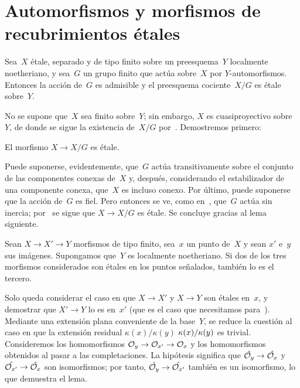 
\section{Automorfismos y morfismos de recubrimientos étales}
\label{V.3}

\begin{proposition}
\label{V.3.1}
Sea~$X$ étale, separado y de tipo finito sobre un preesquema~$Y$ localmente
noetheriano, y sea~$G$ un grupo finito que actúa sobre~$X$ por
$Y$-automorfismos. Entonces la acción de~$G$ es admisible y el preesquema
cociente~$X/G$ es étale sobre~$Y$.
\end{proposition}

No se supone que~$X$ sea finito sobre~$Y$; sin embargo, $X$ es
cuasiproyectivo sobre~$Y$, de donde se sigue la existencia de~$X/G$
por~. Demostremos primero:

\begin{corollaire}
\label{V.3.2}
El morfismo $X\to X/G$ es étale.
\end{corollaire}

Puede suponerse, evidentemente, que~$G$ actúa transitivamente sobre el
conjunto de las componentes conexas de~$X$ y, después, considerando el
estabilizador de una componente conexa, que~$X$ es incluso conexo. Por último,
puede suponerse que la acción de~$G$ es fiel. Pero entonces se ve, como
en~, que~$G$ actúa sin inercia; por~ se sigue que
$X\to X/G$ es étale. Se concluye gracias al lema siguiente.

\begin{lemme}
\label{V.3.3}
Sean $X\to X'\to Y$ morfismos de tipo finito, sea~$x$ un punto de~$X$ y sean
$x'$ e~$y$ sus imágenes. Supongamos que~$Y$ es localmente noetheriano. Si dos
de los tres morfismos considerados son étales en los puntos señalados, también
lo es el tercero.
\end{lemme}

Solo queda considerar el caso en que $X\to X'$ y $X\to Y$ son étales en~$x$,
y demostrar que $X'\to Y$ lo es en~$x'$ (que es el caso que necesitamos
para~). Mediante una extensión plana conveniente de la base~$Y$, se
reduce la cuestión al caso en que la extensión residual
{$\kappa(x)/\kappa(y)$}
{$\kres(x)/\kres(y)$}
es trivial. Consideremos los homomorfismos
$\cal{O}_y\to\cal{O}_{x'}\to\cal{O}_x$ y los homomorfismos obtenidos al pasar
a las completaciones. La hipótesis significa que
$\hat{\cal{O}_y}\to\hat{\cal{O}_x}$ y
$\hat{\cal{O}_{x'}}\to\hat{\cal{O}_x}$ son isomorfismos; por tanto,
$\hat{\cal{O}_y}\to\hat{\cal{O}_{x'}}$ también es un isomorfismo, lo que
demuestra el lema.

